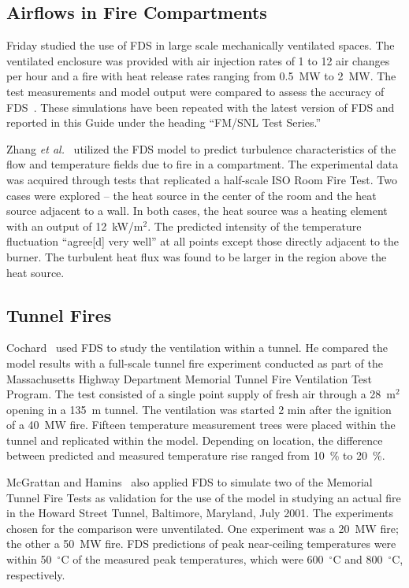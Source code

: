 \subsection{Airflows in Fire Compartments}

Friday studied the  use of FDS in large  scale mechanically ventilated spaces.   The ventilated  enclosure  was provided  with air  injection rates
of  1 to 12 air  changes per hour  and a fire with  heat release rates ranging  from 0.5~MW to  2~MW.  The test measurements  and model output were
compared to assess the accuracy of FDS~\cite{Friday:1}. These simulations have been repeated with the latest version of FDS and reported in this Guide under
the heading ``FM/SNL Test Series.''

Zhang {\em  et al.}~\cite{Zhang:2} utilized  the FDS model  to predict turbulence characteristics  of the flow and temperature  fields due to fire
in a compartment.   The experimental  data was  acquired through tests that replicated a half-scale ISO Room Fire Test.  Two cases were explored --
the heat  source in  the center  of the  room and  the heat source adjacent to a wall.  In both cases, the heat source was a heating element with an output of
12~kW/m$^2$.   The predicted  intensity
of  the temperature  fluctuation  ``agree[d] very well'' at  all points  except those directly  adjacent to  the burner. The turbulent heat flux was
found to be larger in the region above the heat source.


\subsection{Tunnel Fires}

Cochard~\cite{Cochard:1} used  FDS to  study the ventilation  within a tunnel. He  compared the model  results with a full-scale  tunnel fire
experiment conducted  as part of the  Massachusetts Highway Department Memorial Tunnel Fire Ventilation  Test Program.  The test consisted of a
single  point supply of  fresh air through  a 28~m$^2$ opening  in a 135~m tunnel.  The ventilation was started 2 min after the ignition of a  40~MW
fire.  Fifteen  temperature  measurement  trees were  placed within  the  tunnel and  replicated  within  the  model. Depending  on location,  the
difference between  predicted and  measured temperature rise ranged from 10~\% to 20~\%.

McGrattan and Hamins~\cite{McGrattan:HST} also applied FDS to simulate two of the Memorial Tunnel Fire Tests as validation for the use of the model
in  studying  an  actual  fire in  the  Howard  Street  Tunnel, Baltimore,  Maryland,  July  2001.  The  experiments  chosen  for  the comparison
were unventilated. One  experiment was  a 20~MW  fire; the other a 50~MW fire.  FDS predictions of peak near-ceiling temperatures were within
50~$^\circ$C of the measured peak temperatures, which were 600~$^\circ$C and 800~$^\circ$C, respectively.

